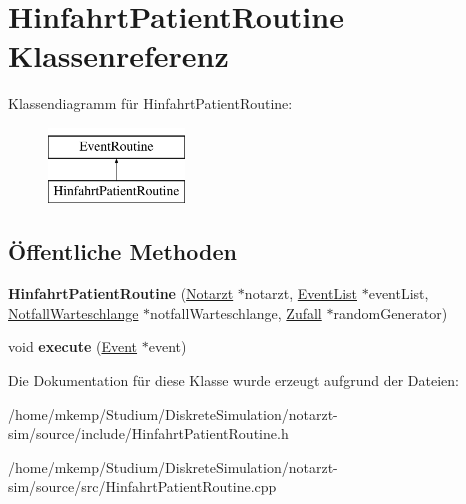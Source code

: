 \hypertarget{classHinfahrtPatientRoutine}{}\section{Hinfahrt\+Patient\+Routine Klassenreferenz}
\label{classHinfahrtPatientRoutine}
Klassendiagramm für Hinfahrt\+Patient\+Routine\+:\begin{figure}[H]
\begin{center}
\leavevmode
\includegraphics[height=2.000000cm]{classHinfahrtPatientRoutine}
\end{center}
\end{figure}
\subsection*{Öffentliche Methoden}
\begin{DoxyCompactItemize}
\item 
{\bfseries Hinfahrt\+Patient\+Routine} (\hyperlink{classNotarzt}{Notarzt} $\ast$notarzt, \hyperlink{classEventList}{Event\+List} $\ast$event\+List, \hyperlink{classNotfallWarteschlange}{Notfall\+Warteschlange} $\ast$notfall\+Warteschlange, \hyperlink{classZufall}{Zufall} $\ast$random\+Generator)\hypertarget{classHinfahrtPatientRoutine_aef87b22e6bb463ec319534f2e33ba8be}{}\label{classHinfahrtPatientRoutine_aef87b22e6bb463ec319534f2e33ba8be}

\item 
void {\bfseries execute} (\hyperlink{classEvent}{Event} $\ast$event)\hypertarget{classHinfahrtPatientRoutine_a95ee9981032536e15cad4bbe0fcb6903}{}\label{classHinfahrtPatientRoutine_a95ee9981032536e15cad4bbe0fcb6903}

\end{DoxyCompactItemize}


Die Dokumentation für diese Klasse wurde erzeugt aufgrund der Dateien\+:\begin{DoxyCompactItemize}
\item 
/home/mkemp/\+Studium/\+Diskrete\+Simulation/notarzt-\/sim/source/include/Hinfahrt\+Patient\+Routine.\+h\item 
/home/mkemp/\+Studium/\+Diskrete\+Simulation/notarzt-\/sim/source/src/Hinfahrt\+Patient\+Routine.\+cpp\end{DoxyCompactItemize}
